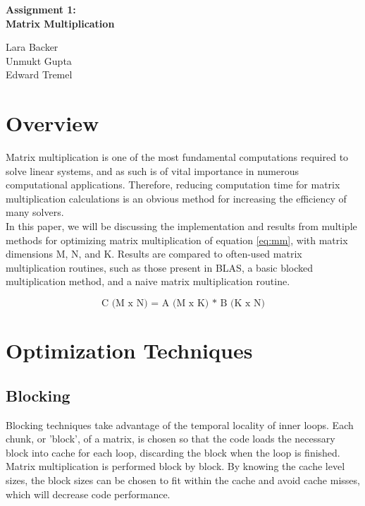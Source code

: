 \documentclass[letterpaper]{article}	 %
\begin{document}
\begin{center}
    \Large
    \textbf{Assignment 1: \\ Matrix Multiplication}
    
    \vspace{0.4cm}
    \large
        
    \vspace{0.4cm}
    Lara Backer \\ Unmukt Gupta \\ Edward Tremel

\end{center}


\section{Overview}

Matrix multiplication is one of the most fundamental computations required to solve linear systems, and as such is of vital importance in numerous computational applications. Therefore, reducing computation time for matrix multiplication calculations is an obvious method for increasing the efficiency of many solvers. \\

In this paper, we will be discussing the implementation and results from multiple methods for optimizing matrix multiplication of equation \ref{eq:mm}, with matrix dimensions M, N, and K. Results are compared to often-used matrix multiplication routines, such as those present in BLAS, a basic blocked multiplication method, and a naive matrix multiplication routine. 

\begin{equation}
\text{C (M x N) = A (M x K) * B (K x N)}
\label{eq:mm}
\end{equation}

\section{Optimization Techniques}

\subsection{Blocking}
Blocking techniques take advantage of the temporal locality of inner loops. Each chunk, or 'block', of a matrix, is chosen so that the code loads the necessary block into cache for each loop, discarding the block when the loop is finished. Matrix multiplication is performed block by block. By knowing the cache level sizes, the block sizes can be chosen to fit within the cache and avoid cache misses, which will decrease code performance. \\ 
\end{document}
